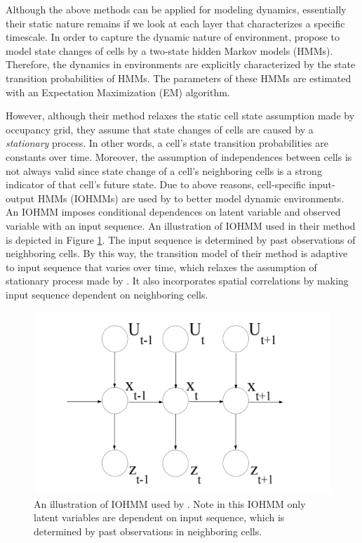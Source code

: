 Although the above methods can be applied for modeling dynamics, essentially their static nature remains if we look at each layer that characterizes a specific timescale. In order to capture the dynamic nature of environment, \citet{meyer2012occupancy} propose to model state changes of cells by a two-state hidden Markov models (HMMs). Therefore, the dynamics in environments are explicitly characterized by the state transition probabilities of HMMs. The parameters of these HMMs are estimated with an Expectation Maximization (EM) algorithm. 

However, although their method relaxes the static cell state assumption made by occupancy grid, they assume that state changes of cells are caused by a \textit{stationary} process. In other words, a cell's state transition probabilities are constants over time. Moreover, the assumption of independences between cells is not always valid since state change of a cell's neighboring cells is a strong indicator of that cell's future state. Due to above reasons, cell-specific input-output HMMs (IOHMMs) are used by \citet{wang2014modeling} to better model dynamic environments. An IOHMM imposes conditional dependences on latent variable and observed variable with an input sequence. An illustration of IOHMM used in their method is depicted in Figure \ref{fig:IOHMM}. The input sequence is determined by past observations of neighboring cells. By this way, the transition model of their method is adaptive to input sequence that varies over time, which relaxes the assumption of stationary process made by \citet{meyer2012occupancy}. It also incorporates spatial correlations by making input sequence dependent on neighboring cells. 

\begin{figure}[H]
  \centering
    \includegraphics[width=.6\textwidth]{figures/IOHMM.png}
    \caption[An illustration of IOHMM.]{An illustration of IOHMM used by \citet{wang2014modeling}. Note in this IOHMM only latent variables are dependent on input sequence, which is determined by past observations in neighboring cells.}
    \label{fig:IOHMM}
\end{figure} 

